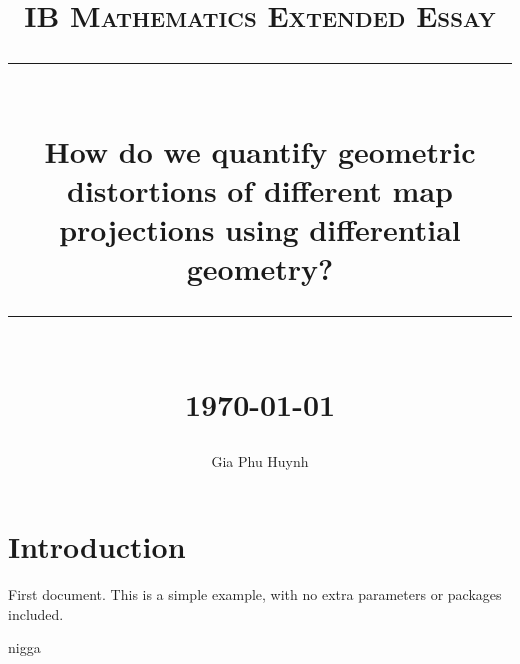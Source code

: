 \documentclass[12pt]{article}
\title{ 
    \normalsize \textsc{IB Mathematics Extended Essay} \\ [1.5cm]
	\rule{\linewidth}{0.5pt} \\
	\Large \textbf{How do we quantify geometric distortions of different map projections using differential geometry?}
	\rule{\linewidth}{1pt} \\ [0.75cm]
	\normalsize \today \vspace*{5\baselineskip}
}
\date{}
\author{Gia Phu Huynh}
\begin{document}
\maketitle

\pagebreak
\tableofcontents

\pagebreak
\section{Introduction}
First document. This is a simple example, with no 
extra parameters or packages included.
\begin{definition}
	nigga
\end{definition}
\end{document}
